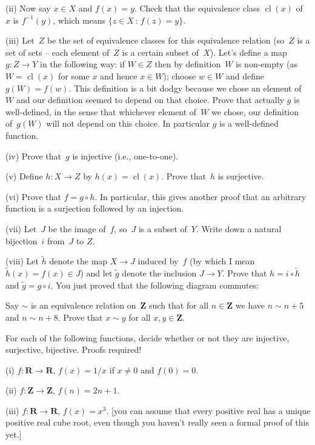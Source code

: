 \documentclass[10pt]{article}
\newcommand{\R}{\mathbf{R}}
\DeclareMathOperator{\cl}{cl}
\newcommand{\Z}{\mathbf{Z}}
\begin{document}
(ii) Now say $x\in X$ and $f(x)=y$. Check that the equivalence class $\cl(x)$ of~$x$ is $f^{-1}(y)$, which means $\{z\in X\,:\,f(z)=y\}$.

(iii) Let~$Z$ be the set of equivalence classes for this equivalence relation (so~$Z$ is a set of sets -- each element of~$Z$ is a certain subset of~$X$). Let's define a map $g:Z\to Y$ in the following way: if $W\in Z$ then by definition~$W$ is non-empty (as $W=\cl(x)$ for some $x$ and hence $x\in W$); choose $w\in W$ and define $g(W)=f(w)$. This definition is a bit dodgy because we chose an element of~$W$ and our definition seemed to depend on that choice. Prove that actually $g$ is well-defined, in the sense that whichever element of~$W$ we chose, our definition of~$g(W)$ will not depend on this choice. In particular $g$ is a well-defined function.

(iv) Prove that~$g$ is injective (i.e., one-to-one).

(v) Define $h:X\to Z$ by $h(x)=\cl(x)$. Prove that~$h$ is surjective.

(vi) Prove that $f=g\circ h$. In particular, this gives another proof that an arbitrary function is a surjection followed by an injection.

(vii) Let~$J$ be the image of~$f$, so~$J$ is a subset of~$Y$. Write down a natural bijection~$i$ from~$J$ to $Z$.

(viii) Let $\tilde{h}$ denote the map $X\to J$ induced by~$f$ (by which I mean $\tilde{h}(x)=f(x)\in J$) and let $\tilde{g}$ denote the inclusion $J\to Y$. Prove that $h=i\circ\tilde{h}$ and $\tilde{g}=g\circ i$. You just proved that the following diagram commutes:


\medskip{} Say $\sim$ is an equivalence relation on~$\Z$ such that for all $n\in\Z$ we have $n\sim n+5$ and $n\sim n+8$. Prove that $x\sim y$ for all $x,y\in\Z$.

\medskip{} For each of the following functions, decide whether or not they are injective, surjective, bijective. Proofs required!

(i) $f:\R\to\R$, $f(x)=1/x$ if $x\not=0$ and $f(0)=0$.

(ii) $f:\Z\to\Z$, $f(n)=2n+1$.

(iii) $f:\R\to\R$, $f(x)=x^3$. [you can assume that every positive real has a unique positive real cube root, even though you haven't really seen a formal proof of this yet.]
\end{document}
